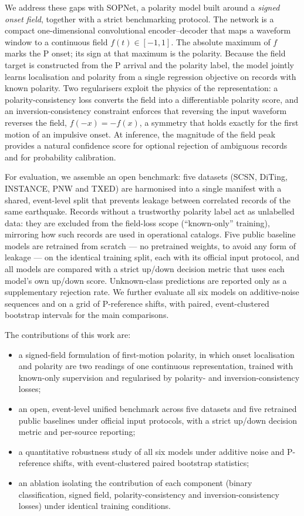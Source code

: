\documentclass[11pt]{article}
\begin{document}
We address these gaps with SOPNet, a polarity model built around a
\emph{signed onset field}, together with a strict benchmarking protocol. The
network is a compact one-dimensional convolutional encoder--decoder that maps
a waveform window to a continuous field $f(t)\in[-1,1]$. The absolute maximum
of $f$ marks the P onset; its sign at that maximum is the polarity. Because the
field target is constructed from the P arrival and the polarity label, the
model jointly learns localisation and polarity from a single regression
objective on records with known polarity. Two regularisers exploit the physics
of the representation: a polarity-consistency loss converts the field into a
differentiable polarity score, and an inversion-consistency constraint enforces
that reversing the input waveform reverses the field, $f(-x) = -f(x)$, a
symmetry that holds exactly for the first motion of an impulsive onset. At
inference, the magnitude of the field peak provides a natural confidence score
for optional rejection of ambiguous records and for probability calibration.

For evaluation, we assemble an open benchmark: five datasets (SCSN, DiTing,
INSTANCE, PNW and TXED) are harmonised into a single manifest with a shared,
event-level split that prevents leakage between correlated records of the same
earthquake. Records without a trustworthy polarity label act as unlabelled
data: they are excluded from the field-loss scope (``known-only'' training),
mirroring how such records are used in operational catalogs. Five public
baseline models are retrained from scratch --- no pretrained weights, to avoid
any form of leakage --- on the identical training split, each with its official
input protocol, and all models are compared with a strict up/down decision
metric that uses each model's own up/down score. Unknown-class predictions are
reported only as a supplementary rejection rate. We further evaluate all six
models on additive-noise sequences and on a grid of P-reference shifts, with
paired, event-clustered bootstrap intervals for the main comparisons.

The contributions of this work are:
\begin{itemize}
  \item a signed-field formulation of first-motion polarity, in which onset
  localisation and polarity are two readings of one continuous representation,
  trained with known-only supervision and regularised by polarity- and
  inversion-consistency losses;
  \item an open, event-level unified benchmark across five datasets and five
  retrained public baselines under official input protocols, with a strict
  up/down decision metric and per-source reporting;
  \item a quantitative robustness study of all six models under additive noise
  and P-reference shifts, with event-clustered paired bootstrap statistics;
  \item an ablation isolating the contribution of each component (binary
  classification, signed field, polarity-consistency and inversion-consistency
  losses) under identical training conditions.
\end{itemize}
\end{document}
